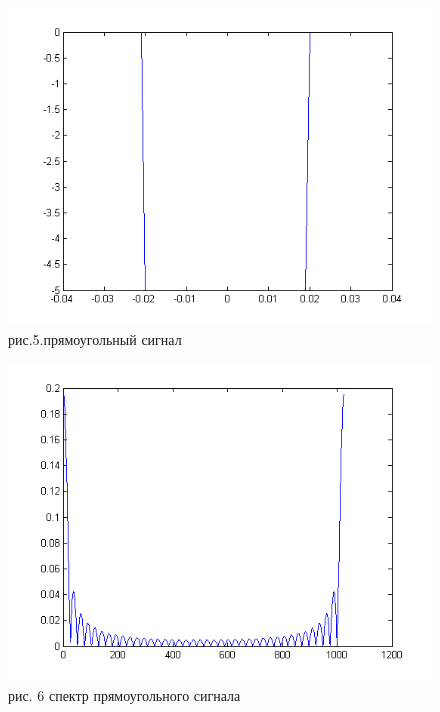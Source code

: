 \documentclass[10pt,a4paper]{report}
\begin{document}
\begin{figure}
\begin{center}
\includegraphics[angle=0, scale = 0.9]{3.png}\newline
рис.5.прямоугольный сигнал\newline
\end{center}
\end{figure}
\begin{figure}
\begin{center}
\includegraphics[angle=0, scale = 0.9]{4.png}\newline
рис. 6 спектр прямоугольного сигнала\newline
\end{center}
\end{figure}
\end{document}
